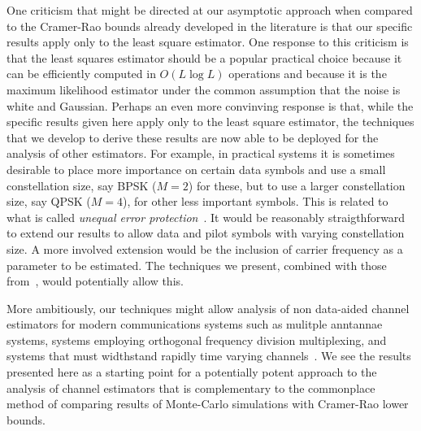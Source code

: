\documentclass[journal]{IEEEtran}
\begin{document}

One criticism that might be directed at our asymptotic approach when compared to the Cramer-Rao bounds already developed in the literature is that our specific results apply only to the least square estimator.  One response to this criticism is that the least squares estimator should be a popular practical choice because it can be efficiently computed in $O(L\log L)$ operations and because it is the maximum likelihood estimator under the common assumption that the noise is white and Gaussian.  Perhaps an even more convinving response is that, while the specific results given here apply only to the least square estimator, the techniques that we develop to derive these results are now able to be deployed for the analysis of other estimators.  For example, in practical systems it is sometimes desirable to place more importance on certain data symbols and use a small constellation size, say BPSK ($M=2$) for these, but to use a larger constellation size, say QPSK ($M=4$), for other less important symbols.  This is related to what is called \emph{unequal error protection}~\cite{Aydinlik_turbo_uep_2008,Sandberg_uep_ldpc_2010}.  It would be reasonably straigthforward to extend our results to allow data and pilot symbols with varying constellation size.  A more involved extension would be the inclusion of carrier frequency as a parameter to be estimated.  The techniques we present, combined with those from~\cite{McKilliamFrequencyEstimationByPhaseUnwrapping2009,McKilliam_mean_dir_est_sq_arc_length2010}, would potentially allow this.  

More ambitiously, our techniques might allow analysis of non data-aided channel estimators for modern communications systems such as mulitple anntannae systems, systems employing orthogonal frequency division multiplexing, and systems that must widthstand rapidly time varying channels~\cite{4138046,Heath99exploitinginput,inthft:204506}.  We see the results presented here as a starting point for a potentially potent approach to the analysis of channel estimators that is complementary to the commonplace method of comparing results of Monte-Carlo simulations with Cramer-Rao lower bounds.
\end{document}
